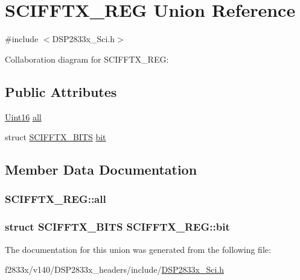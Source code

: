 \hypertarget{union_s_c_i_f_f_t_x___r_e_g}{}\section{S\+C\+I\+F\+F\+T\+X\+\_\+\+R\+E\+G Union Reference}
\label{union_s_c_i_f_f_t_x___r_e_g}


{\ttfamily \#include $<$D\+S\+P2833x\+\_\+\+Sci.\+h$>$}



Collaboration diagram for S\+C\+I\+F\+F\+T\+X\+\_\+\+R\+E\+G\+:
\subsection*{Public Attributes}
\begin{DoxyCompactItemize}
\item 
\hyperlink{_d_s_p2833x___device_8h_a59a9f6be4562c327cbfb4f7e8e18f08b}{Uint16} \hyperlink{union_s_c_i_f_f_t_x___r_e_g_aa502914ae7b85bb69e48335b06694aae}{all}
\item 
struct \hyperlink{struct_s_c_i_f_f_t_x___b_i_t_s}{S\+C\+I\+F\+F\+T\+X\+\_\+\+B\+I\+T\+S} \hyperlink{union_s_c_i_f_f_t_x___r_e_g_aa6e3413a407862cdf89298e9eccb7ed9}{bit}
\end{DoxyCompactItemize}


\subsection{Member Data Documentation}
\hypertarget{union_s_c_i_f_f_t_x___r_e_g_aa502914ae7b85bb69e48335b06694aae}{}
\subsubsection[{all}]{ S\+C\+I\+F\+F\+T\+X\+\_\+\+R\+E\+G\+::all}\label{union_s_c_i_f_f_t_x___r_e_g_aa502914ae7b85bb69e48335b06694aae}
\hypertarget{union_s_c_i_f_f_t_x___r_e_g_aa6e3413a407862cdf89298e9eccb7ed9}{}
\subsubsection[{bit}]{\setlength{\rightskip}{0pt plus 5cm}struct {\bf S\+C\+I\+F\+F\+T\+X\+\_\+\+B\+I\+T\+S} S\+C\+I\+F\+F\+T\+X\+\_\+\+R\+E\+G\+::bit}\label{union_s_c_i_f_f_t_x___r_e_g_aa6e3413a407862cdf89298e9eccb7ed9}


The documentation for this union was generated from the following file\+:\begin{DoxyCompactItemize}
\item 
f2833x/v140/\+D\+S\+P2833x\+\_\+headers/include/\hyperlink{_d_s_p2833x___sci_8h}{D\+S\+P2833x\+\_\+\+Sci.\+h}\end{DoxyCompactItemize}
